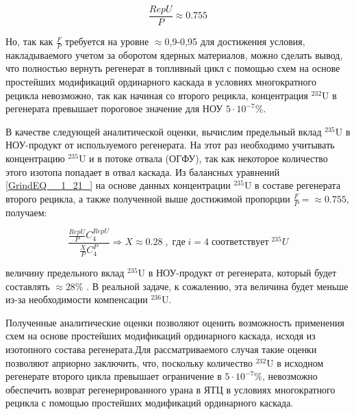 \begin{equation}
  \label{eq_232_balance_X}
    \frac{RepU}{P} \approx 0.755
\end{equation}

Но, так как $\frac{F}{P}$ требуется на уровне $\approx$0,9-0,95 для достижения условия, накладываемого учетом за оборотом ядерных материалов, можно сделать вывод, что полностью вернуть регенерат в топливный цикл с помощью схем на основе простейших модификаций ординарного каскада в условиях многократного рецикла невозможно, так как начиная со второго рецикла, концентрация $^{232}$U в регенерата превышает пороговое значение для НОУ $5\cdot10^{-7}$\%.

В качестве следующей аналитической оценки, вычислим предельный вклад $^{235}$U в НОУ-продукт от используемого регенерата. На этот раз необходимо учитывать концентрацию $^{235}$U и в потоке отвала (ОГФУ), так как некоторое количество этого изотопа попадает в отвал каскада. Из балансных уравнений \ref{GrindEQ__1_21_} на основе данных концентрации $^{235}$U в составе регенерата второго рецикла, а также полученной выше достижимой пропорции  $\frac{F}{P} = \approx 0.755$, получаем:

\begin{equation}
  \label{eq_235_balance_X}
    \frac{\frac{RepU}{P}C_{4}^{RepU}}{\frac{X}{P}C_{4}^{P}} \Rightarrow X \approx 0.28\;,\; где\;i=4\;соответствует\;^{235}U
\end{equation}



величину предельного вклад $^{235}$U в НОУ-продукт от регенерата, который будет составлять $\approx$28\% . В реальной задаче, к сожалению, эта величина будет меньше из-за необходимости компенсации $^{236}$U.

Полученные аналитические оценки позволяют оценить возможность применения схем на основе простейших модификаций ординарного каскада, исходя из изотопного состава регенерата.Для рассматриваемого случая такие оценки позволяют априорно заключить, что, поскольку количество $^{232}$U в исходном регенерате второго цикла превышает ограничение в $5\cdot10^{-7}$\%, невозможно обеспечить возврат регенерированного урана в ЯТЦ в условиях многократного рецикла с помощью простейших модификаций ординарного каскада.


